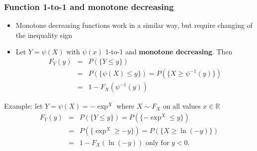 \documentclass[notes=show,smaller,handout]{beamer}
\renewcommand{\Pr}{P}
\newenvironment{stepitemize}{\begin{itemize}[<+->]}{\end{itemize} }
\begin{document}
\begin{frame}%

\frametitle{Function 1-to-1 and monotone decreasing}

\begin{stepitemize}
\item Monotone decreasing functions work in a similar way, but require
changing of the inequality sign

\item Let $Y=\psi \left( X\right) $ with $\psi \left( x\right) $ 1-to-1 and 
\textbf{monotone decreasing}. Then 
\begin{eqnarray*}
F_{Y}\left( y\right) &=&\Pr \left( \{ Y\leq y \} \right) \\
&=&\Pr \left( \{ \psi \left( X\right) \leq y \} \right) =\Pr \left( \{ X\geq \psi
^{-1}\left( y\right) \} \right) \\
&=&1-F_{X}\left( \psi ^{-1}\left( y\right) \right)
\end{eqnarray*}

\end{stepitemize}
\begin{example}
Example: let $Y=\psi \left( X\right) =-\exp^ X $ where $%
X\sim F_X$ on all values $x\in 
\mathbb{R}
$%
\begin{eqnarray*}
F_{Y}\left( y\right) &=&\Pr \left( \{ Y\leq y \}\right) =\Pr \left( \{ -\exp ^
X \leq y \} \right) \\
&=&\Pr \left( \{ \exp^ X \geq -y \} \right) =\Pr \left( \{ X\geq \ln
\left( -y\right) \} \right) \\
&=&1-F_{X}\left( \ln \left( -y\right) \right) \text{ only for }y<0\text{.}
\end{eqnarray*}
\end{example}


\end{frame}%
\end{document}
